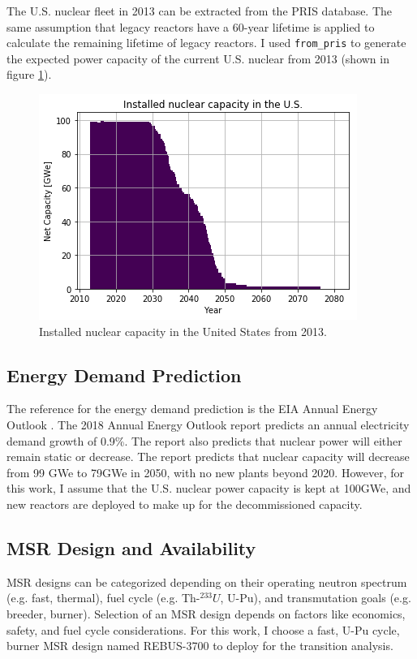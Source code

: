 The U.S. nuclear fleet in 2013 can be extracted from the \gls{PRIS} database.
The same assumption that legacy reactors have a 60-year lifetime is applied
to calculate the remaining lifetime of legacy reactors.
I used \texttt{from\_pris} to generate the expected power capacity
of the current U.S. nuclear from 2013 (shown in figure \ref{fig:us_legacy}).

\begin{figure}[htbp!]
	\begin{center}
		\includegraphics[scale=0.7]{./images/us/legacy_power.png}
	\end{center}
	\caption{Installed nuclear capacity in the United States from 2013.}
	\label{fig:us_legacy}
\end{figure}


\subsection{Energy Demand Prediction}
The reference for the energy demand prediction is the 
\gls{EIA} Annual Energy Outlook \cite{u.s._eia_annual_2018}.
The 2018 Annual Energy Outlook report predicts an annual electricity demand growth
of 0.9\%. The report also predicts that nuclear
power will either remain static or decrease. The report
predicts that nuclear capacity will decrease from 99 GWe
to 79GWe in 2050, with no new plants beyond 2020.
However, for this work,
I assume that the U.S. nuclear power capacity is kept at
100GWe, and new reactors are deployed to make up for the
decommissioned capacity.

\subsection{\gls{MSR} Design and Availability}

\gls{MSR} designs can be categorized depending on their operating
neutron spectrum (e.g. fast, thermal), fuel cycle (e.g. Th-$^{233}U$, U-Pu),
and transmutation goals (e.g. breeder, burner). Selection of an \gls{MSR}
design depends on factors like economics, safety, and fuel cycle
considerations. For this work, I choose a fast, U-Pu cycle, burner \gls{MSR} design
named REBUS-3700 \cite{mourogov_potentialities_2006} to deploy for the
transition analysis.

